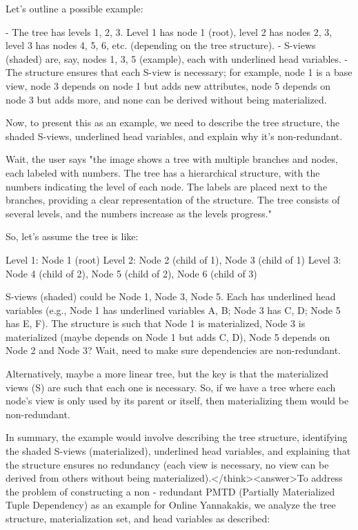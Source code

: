 Let's outline a possible example:

- The tree has levels 1, 2, 3. Level 1 has node 1 (root), level 2 has nodes 2, 3, level 3 has nodes 4, 5, 6, etc. (depending on the tree structure).
- S-views (shaded) are, say, nodes 1, 3, 5 (example), each with underlined head variables.
- The structure ensures that each S-view is necessary; for example, node 1 is a base view, node 3 depends on node 1 but adds new attributes, node 5 depends on node 3 but adds more, and none can be derived without being materialized.

Now, to present this as an example, we need to describe the tree structure, the shaded S-views, underlined head variables, and explain why it's non-redundant.

Wait, the user says "the image shows a tree with multiple branches and nodes, each labeled with numbers. The tree has a hierarchical structure, with the numbers indicating the level of each node. The labels are placed next to the branches, providing a clear representation of the structure. The tree consists of several levels, and the numbers increase as the levels progress."

So, let's assume the tree is like:

Level 1: Node 1 (root)
Level 2: Node 2 (child of 1), Node 3 (child of 1)
Level 3: Node 4 (child of 2), Node 5 (child of 2), Node 6 (child of 3)

S-views (shaded) could be Node 1, Node 3, Node 5. Each has underlined head variables (e.g., Node 1 has underlined variables A, B; Node 3 has C, D; Node 5 has E, F). The structure is such that Node 1 is materialized, Node 3 is materialized (maybe depends on Node 1 but adds C, D), Node 5 depends on Node 2 and Node 3? Wait, need to make sure dependencies are non-redundant.

Alternatively, maybe a more linear tree, but the key is that the materialized views (S) are such that each one is necessary. So, if we have a tree where each node's view is only used by its parent or itself, then materializing them would be non-redundant.

In summary, the example would involve describing the tree structure, identifying the shaded S-views (materialized), underlined head variables, and explaining that the structure ensures no redundancy (each view is necessary, no view can be derived from others without being materialized).</think><answer>To address the problem of constructing a non - redundant PMTD (Partially Materialized Tuple Dependency) as an example for Online Yannakakis, we analyze the tree structure, materialization set, and head variables as described:  


